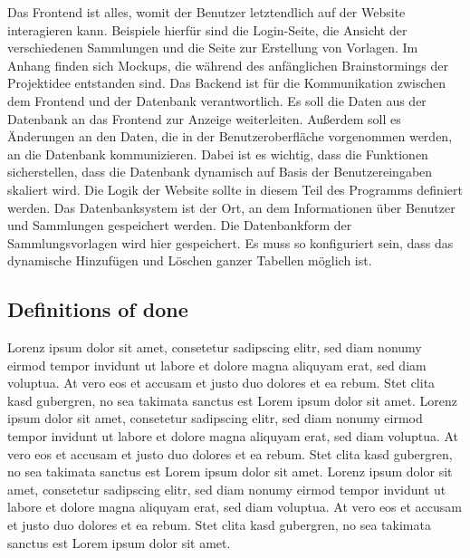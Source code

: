 Das Frontend ist alles, womit der Benutzer letztendlich auf der Website interagieren kann.
Beispiele hierfür sind die Login-Seite, die Ansicht der verschiedenen Sammlungen und die Seite zur Erstellung von Vorlagen.
Im Anhang finden sich Mockups, die während des anfänglichen Brainstormings der Projektidee entstanden sind.
Das Backend ist für die Kommunikation zwischen dem Frontend und der Datenbank verantwortlich.
Es soll die Daten aus der Datenbank an das Frontend zur Anzeige weiterleiten.
Außerdem soll es Änderungen an den Daten, die in der Benutzeroberfläche vorgenommen werden, an die Datenbank kommunizieren.
Dabei ist es wichtig, dass die Funktionen sicherstellen, dass die Datenbank dynamisch auf Basis der Benutzereingaben skaliert wird.
Die Logik der Website sollte in diesem Teil des Programms definiert werden.
Das Datenbanksystem ist der Ort, an dem Informationen über Benutzer und Sammlungen gespeichert werden.
Die Datenbankform der Sammlungsvorlagen wird hier gespeichert.
Es muss so konfiguriert sein, dass das dynamische Hinzufügen und Löschen ganzer Tabellen möglich ist.

\subsection{Definitions of done}\label{subsec:DoD}
Lorenz ipsum dolor sit amet, consetetur sadipscing elitr, sed diam nonumy eirmod tempor invidunt ut labore et dolore magna aliquyam erat, sed diam voluptua.
At vero eos et accusam et justo duo dolores et ea rebum.
Stet clita kasd gubergren, no sea takimata sanctus est Lorem ipsum dolor sit amet.
Lorenz ipsum dolor sit amet, consetetur sadipscing elitr, sed diam nonumy eirmod tempor invidunt ut labore et dolore magna aliquyam erat, sed diam voluptua.
At vero eos et accusam et justo duo dolores et ea rebum.
Stet clita kasd gubergren, no sea takimata sanctus est Lorem ipsum dolor sit amet.
Lorenz ipsum dolor sit amet, consetetur sadipscing elitr, sed diam nonumy eirmod tempor invidunt ut labore et dolore magna aliquyam erat, sed diam voluptua.
At vero eos et accusam et justo duo dolores et ea rebum.
Stet clita kasd gubergren, no sea takimata sanctus est Lorem ipsum dolor sit amet.


